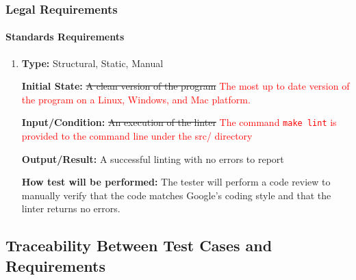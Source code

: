 \documentclass[12pt, titlepage]{article}
\begin{document}
\subsubsection{Legal Requirements}
		
\paragraph{Standards Requirements}

\begin{enumerate}[label=NFR-SR\arabic*:, wide=0pt, leftmargin=*]

\item \phantom{empty}

\textbf{Type:} Structural, Static, Manual
					
\textbf{Initial State:} \sout{A clean version of the program}
\textcolor{red}{The most up to date version of the program on a Linux, Windows, and Mac platform.}
					
\textbf{Input/Condition:} \sout{An execution of the linter}
\textcolor{red}{The command \texttt{make lint} is provided to the command line under the src/ directory}
					
\textbf{Output/Result:} A successful linting with no errors to report
					
\textbf{How test will be performed:} The tester will perform a code review to manually verify that the code matches Google's coding style and that the linter returns no errors.

\end{enumerate}
\newpage

\subsection{Traceability Between Test Cases and Requirements}
\end{document}
